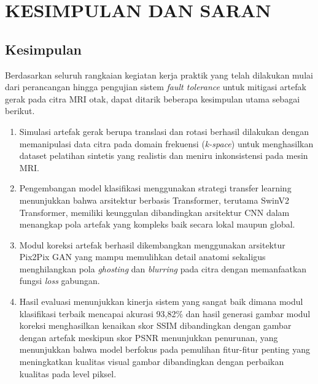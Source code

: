 \chapter{KESIMPULAN DAN SARAN}


\section{Kesimpulan}

Berdasarkan seluruh rangkaian kegiatan kerja praktik yang telah dilakukan mulai dari perancangan hingga pengujian sistem \textit{fault tolerance} untuk mitigasi artefak gerak pada citra MRI otak, dapat ditarik beberapa kesimpulan utama sebagai berikut.

\begin{enumerate}[nolistsep]

  \item Simulasi artefak gerak berupa translasi dan rotasi berhasil dilakukan dengan memanipulasi data citra pada domain frekuensi (\textit{k-space}) untuk menghasilkan dataset pelatihan sintetis yang realistis dan meniru inkonsistensi pada mesin MRI.

  \item Pengembangan model klasifikasi menggunakan strategi transfer learning menunjukkan bahwa arsitektur berbasis Transformer, terutama SwinV2 Transformer, memiliki keunggulan dibandingkan arsitektur CNN dalam menangkap pola artefak yang kompleks baik secara lokal maupun global.

  \item Modul koreksi artefak berhasil dikembangkan menggunakan arsitektur Pix2Pix GAN yang mampu memulihkan detail anatomi sekaligus menghilangkan pola \textit{ghosting} dan \textit{blurring} pada citra dengan memanfaatkan fungsi \textit{loss} gabungan.
  
  \item Hasil evaluasi menunjukkan kinerja sistem yang sangat baik dimana modul klasifikasi terbaik mencapai akurasi 93,82\% dan hasil generasi gambar modul koreksi menghasilkan kenaikan skor SSIM dibandingkan dengan gambar dengan artefak meskipun skor PSNR menunjukkan penurunan, yang menunjukkan bahwa model berfokus pada pemulihan fitur-fitur penting yang meningkatkan kualitas visual gambar dibandingkan dengan perbaikan kualitas pada level piksel.

\end{enumerate}

